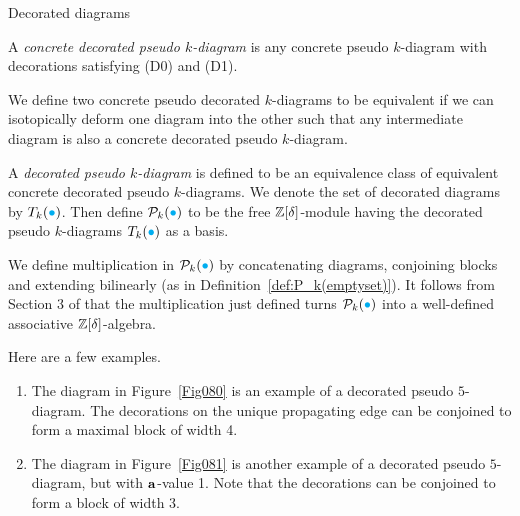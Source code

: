 \begin{section}{Decorated diagrams}
\begin{enumerate}[leftmargin=0.6in]

\end{enumerate}

\begin{definition}
A \emph{concrete decorated pseudo $k$-diagram} is any concrete pseudo $k$-diagram with decorations satisfying (D0) and (D1).
\end{definition}

\begin{definition}
We define two concrete pseudo decorated $k$-diagrams to be equivalent if we can isotopically deform one diagram into the other such that any intermediate diagram is also a concrete decorated pseudo $k$-diagram. 
\end{definition}

\begin{definition}\label{def:T_{k}(Omega)}
\rm A \emph{decorated pseudo $k$-diagram} is defined to be an equivalence class of equivalent concrete decorated pseudo $k$-diagrams.  We denote the set of decorated diagrams by $T_{k}({\color{cyan}\bullet})$.
Then define $\mathcal{P}_{k}({\color{cyan}\bullet})$ to be the free $\mathbb{Z}[\delta]$-module having the decorated pseudo $k$-diagrams $T_{k}({\color{cyan}\bullet})$ as a basis.  
\end{definition}

We define multiplication in $\mathcal{P}_{k}({\color{cyan}\bullet})$ by concatenating diagrams, conjoining blocks and extending bilinearly (as in Definition~\ref{def:P_k(emptyset)}). It follows from Section 3 of \cite{Ernst2012} that the multiplication just defined turns $\mathcal{P}_{k}({\color{cyan}\bullet})$ into a well-defined associative $\mathbb{Z}[\delta]$-algebra.

 
\begin{example}\label{ex:decorated diagrams}
\rm Here are a few examples.
\begin{enumerate}[leftmargin=0.6in]
\item  The diagram in Figure~\ref{Fig080} is an example of a decorated pseudo $5$-diagram. The decorations on the unique propagating edge can be conjoined to form a maximal block of width 4.

\item  The diagram in Figure~\ref{Fig081} is another example of a decorated pseudo $5$-diagram, but with $\mathbf{a}$-value 1.  Note that the decorations can be conjoined to form a block of width 3.


\end{enumerate}
\end{example}
\end{section}
